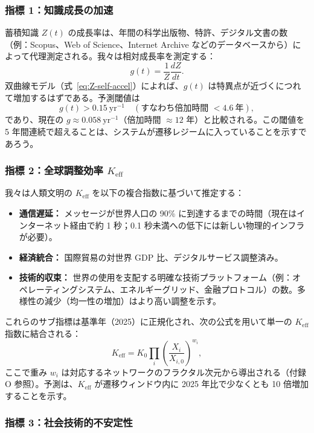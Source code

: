 \documentclass[12pt,a4paper]{article}
\theoremstyle{remark}
\begin{document}
	\subsubsection{指標 1：知識成長の加速}
	
	蓄積知識 \(Z(t)\) の成長率は、年間の科学出版物、特許、デジタル文書の数（例：Scopus、Web of Science、Internet Archive などのデータベースから）によって代理測定される。我々は相対成長率を測定する：
	\[
	g(t) = \frac{1}{Z}\frac{dZ}{dt}.
	\]
	双曲線モデル（式~\ref{eq:Z-self-accel}）によれば、\(g(t)\) は特異点が近づくにつれて増加するはずである。予測閾値は
	\[
	g(t) > 0.15\ \text{yr}^{-1} \quad (\text{すなわち倍加時間 } < 4.6\ \text{年}),
	\]
	であり、現在の \(g\approx 0.058\ \text{yr}^{-1}\)（倍加時間 \(\approx 12\) 年）と比較される。この閾値を 5 年間連続で超えることは、システムが遷移レジームに入っていることを示すであろう。
	
	\subsubsection{指標 2：全球調整効率 \(K_{\text{eff}}\)}
	
	我々は人類文明の \(K_{\text{eff}}\) を以下の複合指数に基づいて推定する：
	
	\begin{itemize}
		\item \textbf{通信遅延：} メッセージが世界人口の 90\% に到達するまでの時間（現在はインターネット経由で約 1 秒；0.1 秒未満への低下には新しい物理的インフラが必要）。
		\item \textbf{経済統合：} 国際貿易の対世界 GDP 比、デジタルサービス調整済み。
		\item \textbf{技術的収束：} 世界の使用を支配する明確な技術プラットフォーム（例：オペレーティングシステム、エネルギーグリッド、金融プロトコル）の数。多様性の減少（均一性の増加）はより高い調整を示す。
	\end{itemize}
	
	これらのサブ指標は基準年（2025）に正規化され、次の公式を用いて単一の \(K_{\text{eff}}\) 指数に結合される：
	\[
	K_{\text{eff}} = K_0 \prod_{i} \left(\frac{X_i}{X_{i,0}}\right)^{w_i},
	\]
	ここで重み \(w_i\) は対応するネットワークのフラクタル次元から導出される（付録 O 参照）。予測は、\(K_{\text{eff}}\) が遷移ウィンドウ内に 2025 年比で少なくとも 10 倍増加することを示す。
	
	\subsubsection{指標 3：社会技術的不安定性}
	
\end{document}

